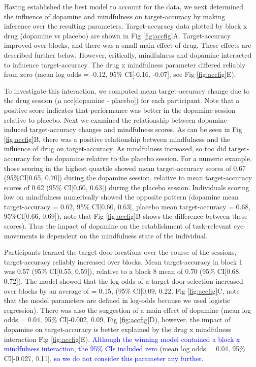 \documentclass[
  man]{apa6}
\begin{document}
Having established the best model to account for the data, we next determined the influence of dopamine and mindfulness on target-accuracy by making inference over the resulting parameters. Target-accuracy data plotted by block x drug (dopamine vs placebo) are shown in Fig \ref{fig:accfig}A. Target-accuracy improved over blocks, and there was a small main effect of drug. These effects are described further below. However, critically, mindfulness and dopamine interacted to influence target-accuracy. The drug x mindfulness parameter differed reliably from zero (mean log odds = -0.12, 95\% CI{[}-0.16, -0.07{]}, see Fig \ref{fig:accfig}E).

To investigate this interaction, we computed mean target-accuracy change due to the drug session (\(\mu\) acc{[}dopamine - placebo{]}) for each participant. Note that a positive score indicates that performance was better in the dopamine session relative to placebo. Next we examined the relationship between dopamine-induced target-accuracy changes and mindfulness scores. As can be seen in Fig \ref{fig:accfig}B, there was a positive relationship between mindfulness and the influence of drug on target-accuracy. As mindfulness increased, so too did target-accuracy for the dopamine relative to the placebo session. For a numeric example, those scoring in the highest quartile showed mean target-accuracy scores of 0.67 (95\%CI{[}0.65, 0.70{]}) during the dopamine session, relative to mean target-accuracy scores of 0.62 (95\% CI{[}0.60, 0.63{]}) during the placebo session. Individuals scoring low on mindfulness numerically showed the opposite pattern (dopamine mean target-accuracy = 0.62, 95\% CI{[}0.60, 0.63{]}, placebo mean target-accuracy = 0.68, 95\%CI{[}0.66, 0.69{]}), note that Fig \ref{fig:accfig}B shows the difference between these scores). Thus the impact of dopamine on the establishment of task-relevant eye-movements is dependent on the mindfulness state of the individual.

Participants learned the target door locations over the course of the sessions, target-accuracy reliably increased over blocks. Mean target-accuracy in block 1 was 0.57 (95\% CI{[}0.55, 0.59{]}), relative to a block 8 mean of 0.70 (95\% CI{[}0.68, 0.72{]}). The model showed that the log-odds of a target door selection increased over blocks by an average of = 0.15, (95\% CI{[}0.09, 0.22, Fig \ref{fig:accfig}C, note that the model parameters are defined in log-odds because we used logistic regression). There was also the suggestion of a main effect of dopamine (mean log odds = 0.04, 95\% CI{[}-0.002, 0.09, Fig \ref{fig:accfig}D), however, the impact of dopamine on target-accuracy is better explained by the drug x mindfulness interaction Fig \ref{fig:accfig}E). \textcolor{blue}{Although the winning model contained a block x mindfulness interaction, the 95\% CIs included zero} (mean log odds = 0.04, 95\% CI{[}-0.027, 0.11{]}, \textcolor{blue}{so we do not consider this parameter any further.}
\end{document}

